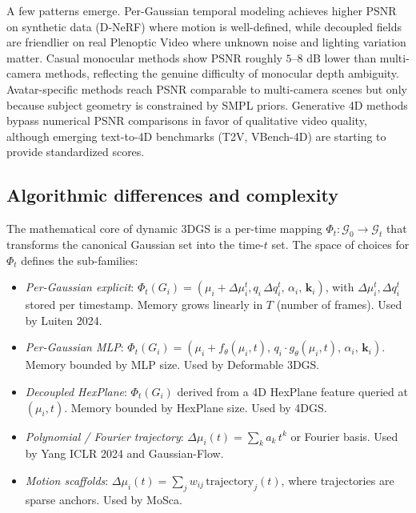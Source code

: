 A few patterns emerge. Per-Gaussian temporal modeling achieves higher PSNR on synthetic data (D-NeRF) where motion is well-defined, while decoupled fields are friendlier on real Plenoptic Video where unknown noise and lighting variation matter. Casual monocular methods show PSNR roughly \(5\)--\(8\) dB lower than multi-camera methods, reflecting the genuine difficulty of monocular depth ambiguity. Avatar-specific methods reach PSNR comparable to multi-camera scenes but only because subject geometry is constrained by SMPL priors. Generative 4D methods bypass numerical PSNR comparisons in favor of qualitative video quality, although emerging text-to-4D benchmarks (T2V, VBench-4D) are starting to provide standardized scores.

\subsection{Algorithmic differences and complexity}\label{algorithmic-differences-and-complexity}

The mathematical core of dynamic 3DGS is a per-time mapping \(\Phi_t: \mathcal{G}_0 \to \mathcal{G}_t\) that transforms the canonical Gaussian set into the time-\(t\) set. The space of choices for \(\Phi_t\) defines the sub-families:

\begin{itemize}
\tightlist
\item
  \emph{Per-Gaussian explicit}: \(\Phi_t(G_i) = (\mu_i + \Delta\mu_i^t, q_i\,\Delta q_i^t,\,\alpha_i,\,\mathbf{k}_i)\), with \(\Delta\mu_i^t,\Delta q_i^t\) stored per timestamp. Memory grows linearly in \(T\) (number of frames). Used by Luiten 2024.
\item
  \emph{Per-Gaussian MLP}: \(\Phi_t(G_i) = (\mu_i + f_\theta(\mu_i,t),\, q_i\cdot g_\theta(\mu_i,t),\,\alpha_i,\,\mathbf{k}_i)\). Memory bounded by MLP size. Used by Deformable 3DGS.
\item
  \emph{Decoupled HexPlane}: \(\Phi_t(G_i)\) derived from a 4D HexPlane feature queried at \((\mu_i,t)\). Memory bounded by HexPlane size. Used by 4DGS.
\item
  \emph{Polynomial / Fourier trajectory}: \(\Delta\mu_i(t) = \sum_{k} a_k\,t^k\) or Fourier basis. Used by Yang ICLR 2024 and Gaussian-Flow.
\item
  \emph{Motion scaffolds}: \(\Delta\mu_i(t) = \sum_j w_{ij}\,\mathrm{trajectory}_j(t)\), where trajectories are sparse anchors. Used by MoSca.
\end{itemize}

